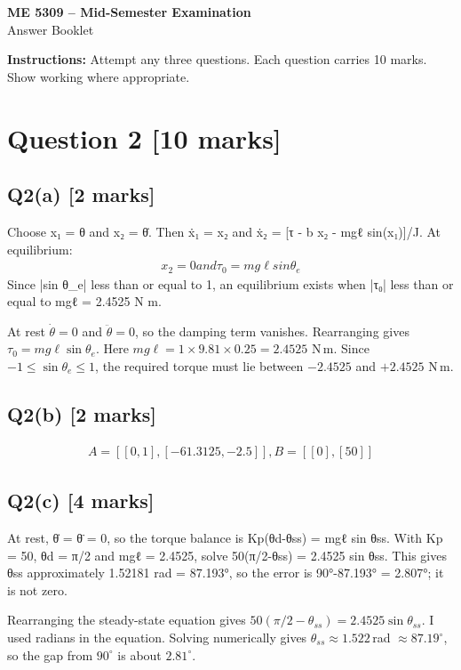 \documentclass[11pt,a4paper]{article}
\begin{document}
\begin{center}
{\Large\bfseries ME 5309 -- Mid-Semester Examination}\\[3pt]
{\large Answer Booklet}\\[8pt]
\end{center}
\textbf{Instructions:} Attempt any three questions. Each question carries 10 marks. Show working where appropriate.
\section*{Question 2 \hfill [10 marks]}
\subsection*{Q2(a) \hfill [2 marks]}

Choose x₁ = θ and x₂ = θ̇.
Then ẋ₁ = x₂ and ẋ₂ = [τ - b x₂ - mgℓ sin(x₁)]/J.
At equilibrium:\[\begin{aligned}x_2 = 0 and τ_0 = mg\ell sin \theta_e\end{aligned}\]
Since |sin θ\_e| less than or equal to 1, an equilibrium exists when |τ₀| less than or equal to mgℓ = 2.4525 N m.\par\smallskip At rest $\dot\theta=0$ and $\ddot\theta=0$, so the damping term vanishes. Rearranging gives $\tau_0=mg\ell\sin\theta_e$. Here $mg\ell=1\times9.81\times0.25=2.4525$ N\,m. Since $-1\leq\sin\theta_e\leq1$, the required torque must lie between $-2.4525$ and $+2.4525$ N\,m.

\subsection*{Q2(b) \hfill [2 marks]}

\[\begin{aligned}A = [[0,1], [-61.3125,-2.5]], B = [[0],[50]]\end{aligned}\]

\subsection*{Q2(c) \hfill [4 marks]}

At rest, θ̇ = θ̈ = 0, so the torque balance is Kp(θd-θss) = mgℓ sin θss.
With Kp = 50, θd = π/2 and mgℓ = 2.4525, solve 50(π/2-θss) = 2.4525 sin θss.
This gives θss approximately 1.52181 rad = 87.193°, so the error is 90°-87.193° = 2.807°; it is not zero.\par\smallskip Rearranging the steady-state equation gives $50(\pi/2-\theta_{ss})=2.4525\sin\theta_{ss}$. I used radians in the equation. Solving numerically gives $\theta_{ss}\approx1.522\,$rad $\approx87.19^\circ$, so the gap from $90^\circ$ is about $2.81^\circ$.
\end{document}
